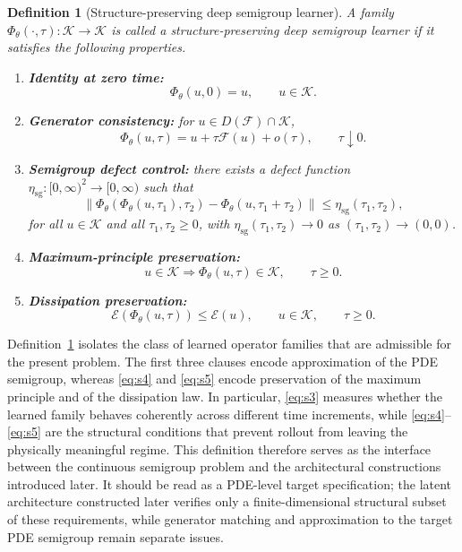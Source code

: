 \documentclass[11pt]{article}
\newtheorem{definition}{Definition}
\newcommand{\cK}{\mathcal{K}}
\newcommand{\cE}{\mathcal{E}}
\newcommand{\cF}{\mathcal{F}}
\newcommand{\PhiT}{\Phi_{\theta}}
\newcommand{\norm}[1]{\left\lVert #1 \right\rVert}
\begin{document}
\begin{definition}[Structure-preserving deep semigroup learner]\label{def:main-learner}
A family \(\PhiT(\cdot,\tau):\cK\to \cK\) is called a structure-preserving deep semigroup learner if it satisfies the following properties.
\begin{enumerate}[label=(S\arabic*)]
    \item \textbf{Identity at zero time:}
    \begin{equation}\label{eq:s1}
    \PhiT(u,0)=u, \qquad u\in \cK.
    \end{equation}

    \item \textbf{Generator consistency:}
    for \(u\in D(\cF)\cap \cK\),
    \begin{equation}\label{eq:s2}
    \PhiT(u,\tau)=u+\tau\cF(u)+o(\tau), \qquad \tau\downarrow 0.
    \end{equation}

    \item \textbf{Semigroup defect control:}
    there exists a defect function \(\eta_{\mathrm{sg}}:[0,\infty)^2\to [0,\infty)\) such that
    \begin{equation}\label{eq:s3}
    \norm{\PhiT(\PhiT(u,\tau_1),\tau_2)-\PhiT(u,\tau_1+\tau_2)} \le \eta_{\mathrm{sg}}(\tau_1,\tau_2),
    \end{equation}
    for all \(u\in \cK\) and all \(\tau_1,\tau_2\ge 0\), with \(\eta_{\mathrm{sg}}(\tau_1,\tau_2)\to 0\) as \((\tau_1,\tau_2)\to (0,0)\).

    \item \textbf{Maximum-principle preservation:}
    \begin{equation}\label{eq:s4}
    u\in \cK \Longrightarrow \PhiT(u,\tau)\in \cK, \qquad \tau\ge 0.
    \end{equation}

    \item \textbf{Dissipation preservation:}
    \begin{equation}\label{eq:s5}
    \cE(\PhiT(u,\tau)) \le \cE(u), \qquad u\in \cK, \qquad \tau\ge 0.
    \end{equation}
\end{enumerate}
\end{definition}

Definition~\ref{def:main-learner} isolates the class of learned operator families that are admissible for the present problem. The first three clauses encode approximation of the PDE semigroup, whereas \eqref{eq:s4} and \eqref{eq:s5} encode preservation of the maximum principle and of the dissipation law. In particular, \eqref{eq:s3} measures whether the learned family behaves coherently across different time increments, while \eqref{eq:s4}--\eqref{eq:s5} are the structural conditions that prevent rollout from leaving the physically meaningful regime. This definition therefore serves as the interface between the continuous semigroup problem and the architectural constructions introduced later. It should be read as a PDE-level target specification; the latent architecture constructed later verifies only a finite-dimensional structural subset of these requirements, while generator matching and approximation to the target PDE semigroup remain separate issues.
\end{document}
